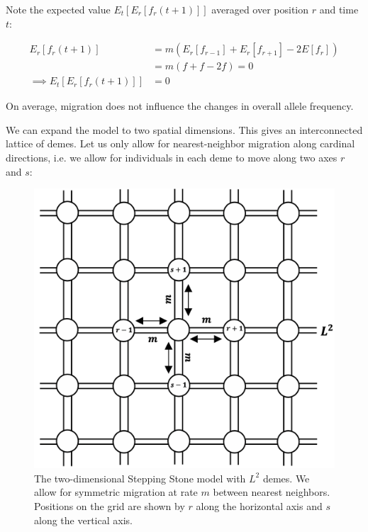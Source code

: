 Note the expected value $E_t[E_r[f_r(t+1)]]$ averaged over position $r$ and time $t$:

\begin{equation} \label{eq:exp_ss}
    \begin{split}
        E_r[f_r(t+1)] &= m(E_r[f_{r-1}] + E_r[f_{r+1}] -2E[f_r]) \\
        &= m(f+f-2f) = 0 \\
        \implies E_t[E_r[f_r(t+1)]] &= 0 
    \end{split}
\end{equation}


On average, migration does not influence the changes in overall allele frequency. 

We can expand the model to two spatial dimensions. This gives an interconnected lattice of demes. Let us only allow for nearest-neighbor migration along cardinal directions, i.e. we allow for individuals in each deme to move along two axes $r$ and $s$:

\begin{figure}[H]
    \centering
    \includegraphics[scale = 0.3]{img/2d_ss.png}
    \caption{The two-dimensional Stepping Stone model with $L^2$ demes. We allow for symmetric migration at rate $m$ between nearest neighbors. Positions on the grid are shown by $r$ along the horizontal axis and $s$ along the vertical axis.}
    \label{fig:2d_ss}
\end{figure}


